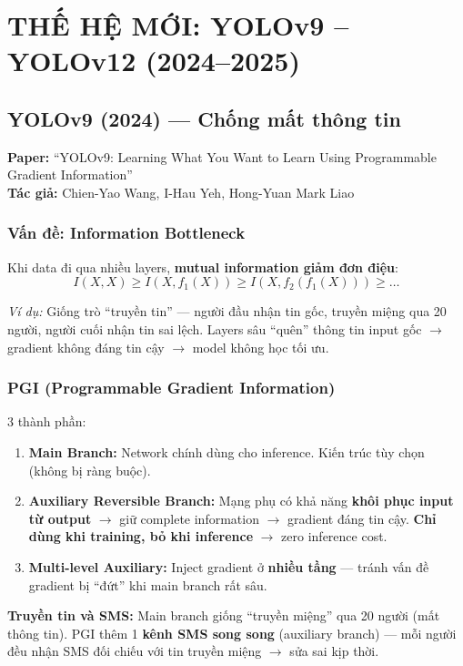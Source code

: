 \chapter{THẾ HỆ MỚI: YOLOv9 -- YOLOv12 (2024--2025)}

\section{YOLOv9 (2024) --- Chống mất thông tin}
\textbf{Paper:} ``YOLOv9: Learning What You Want to Learn Using Programmable Gradient Information''\\
\textbf{Tác giả:} Chien-Yao Wang, I-Hau Yeh, Hong-Yuan Mark Liao

\subsection{Vấn đề: Information Bottleneck}
Khi data đi qua nhiều layers, \textbf{mutual information giảm đơn điệu}:
\[I(X,X) \geq I(X, f_1(X)) \geq I(X, f_2(f_1(X))) \geq \ldots\]

\textit{Ví dụ:} Giống trò ``truyền tin'' --- người đầu nhận tin gốc, truyền miệng qua 20 người, người cuối nhận tin sai lệch. Layers sâu ``quên'' thông tin input gốc $\rightarrow$ gradient không đáng tin cậy $\rightarrow$ model không học tối ưu.

\subsection{PGI (Programmable Gradient Information)}
3 thành phần:
\begin{enumerate}
    \item \textbf{Main Branch:} Network chính dùng cho inference. Kiến trúc tùy chọn (không bị ràng buộc).
    \item \textbf{Auxiliary Reversible Branch:} Mạng phụ có khả năng \textbf{khôi phục input từ output} $\rightarrow$ giữ complete information $\rightarrow$ gradient đáng tin cậy. \textbf{Chỉ dùng khi training, bỏ khi inference} $\rightarrow$ zero inference cost.
    \item \textbf{Multi-level Auxiliary:} Inject gradient ở \textbf{nhiều tầng} --- tránh vấn đề gradient bị ``đứt'' khi main branch rất sâu.
\end{enumerate}

\begin{analogybox}
\textbf{Truyền tin và SMS:} Main branch giống ``truyền miệng'' qua 20 người (mất thông tin). PGI thêm 1 \textbf{kênh SMS song song} (auxiliary branch) --- mỗi người đều nhận SMS đối chiếu với tin truyền miệng $\rightarrow$ sửa sai kịp thời.
\end{analogybox}

